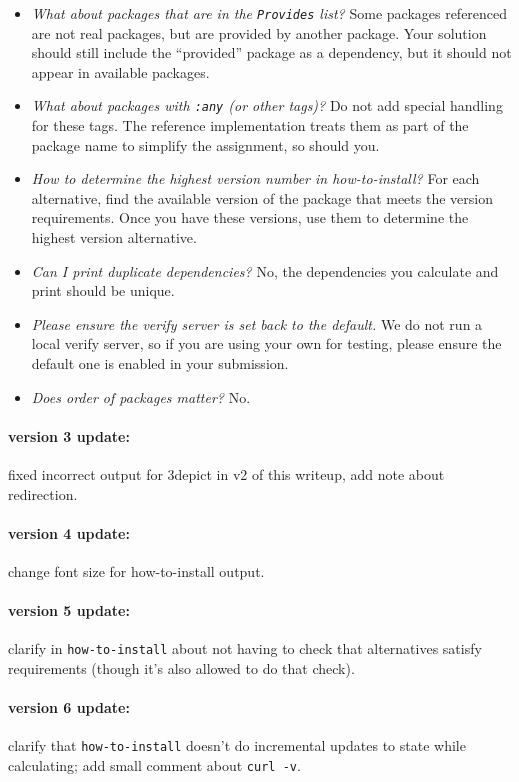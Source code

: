 \documentclass[12pt]{article}
\renewcommand{\_}{\kern-1.5pt\textunderscore\kern-1.5pt}
\begin{document}
\begin{itemize}
\item \emph{What about packages that are in the \texttt{Provides} list?} Some packages referenced are not real packages, but are provided by another package. Your solution should still include the ``provided'' package as a dependency, but it should not appear in available packages.
\item \emph{What about packages with \texttt{:any} (or other tags)?} Do not add special handling for these tags. The reference implementation treats them as part of the package name to simplify the assignment, so should you.
\item \emph{How to determine the highest version number in how-to-install?} For each alternative, find the available version of the package that meets the version requirements. Once you have these versions, use them to determine the highest version alternative.
\item \emph{Can I print duplicate dependencies?} No, the dependencies you calculate and print should be unique.
\item \emph{Please ensure the verify server is set back to the default.} We do not run a local verify server, so if you are using your own for testing, please ensure the default one is enabled in your submission.
\item \emph{Does order of packages matter?} No.
\end{itemize}

\paragraph{version 3 update:} fixed incorrect output for 3depict in v2 of this writeup, add note about redirection.

\paragraph{version 4 update:} change font size for how-to-install output.

\paragraph{version 5 update:} clarify in \texttt{how-to-install} about not having to check that alternatives satisfy requirements (though it's also allowed to do that check).

\paragraph{version 6 update:} clarify that \texttt{how-to-install} doesn't do incremental updates to state while calculating; add small comment about \verb+curl -v+.
\end{document}
